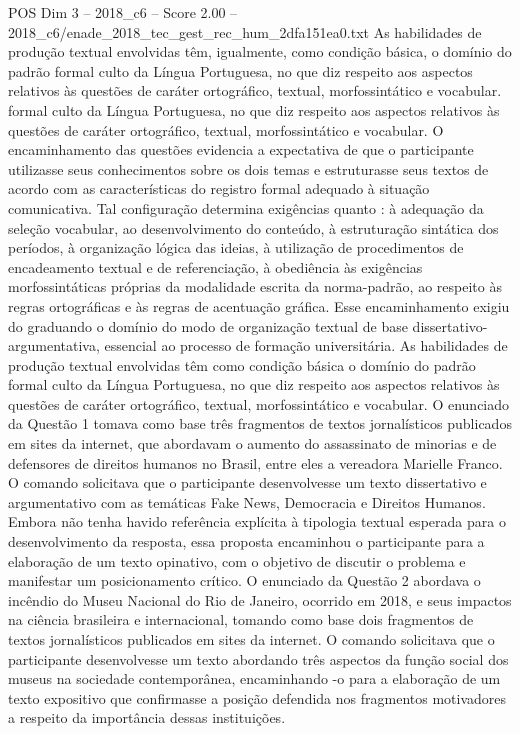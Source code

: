 \begin{textsample}{POS Dim 3 – 2018\_c6 – Score 2.00 – 2018\_c6/enade\_2018\_tec\_gest\_rec\_hum\_2dfa151ea0.txt}
As habilidades de produção textual envolvidas têm, igualmente, como condição básica, o domínio do padrão formal culto da Língua Portuguesa, no que diz respeito aos aspectos relativos às questões de caráter ortográfico, textual, morfossintático e vocabular. formal culto da Língua Portuguesa, no que diz respeito aos aspectos relativos às questões de caráter ortográfico, textual, morfossintático e vocabular.
O encaminhamento das questões evidencia a expectativa de que o participante utilizasse seus conhecimentos sobre os dois temas e estruturasse seus textos de acordo com as características do registro formal adequado à situação comunicativa.
Tal configuração determina exigências quanto : à adequação da seleção vocabular, ao desenvolvimento do conteúdo, à estruturação sintática dos períodos, à organização lógica das ideias, à utilização de procedimentos de encadeamento textual e de referenciação, à obediência às exigências morfossintáticas próprias da modalidade escrita da norma-padrão, ao respeito às regras ortográficas e às regras de acentuação gráfica.
Esse encaminhamento exigiu do graduando o domínio do modo de organização textual de base dissertativo-argumentativa, essencial ao processo de formação universitária.
As habilidades de produção textual envolvidas têm como condição básica o domínio do padrão formal culto da Língua Portuguesa, no que diz respeito aos aspectos relativos às questões de caráter ortográfico, textual, morfossintático e vocabular.
O enunciado da Questão 1 tomava como base três fragmentos de textos jornalísticos publicados em sites da internet, que abordavam o aumento do assassinato de minorias e de defensores de direitos humanos no Brasil, entre eles a vereadora Marielle Franco.
O comando solicitava que o participante desenvolvesse um texto dissertativo e argumentativo com as temáticas Fake News, Democracia e Direitos Humanos.
Embora não tenha havido referência explícita à tipologia textual esperada para o desenvolvimento da resposta, essa proposta encaminhou o participante para a elaboração de um texto opinativo, com o objetivo de discutir o problema e manifestar um posicionamento crítico.
O enunciado da Questão 2 abordava o incêndio do Museu Nacional do Rio de Janeiro, ocorrido em 2018, e seus impactos na ciência brasileira e internacional, tomando como base dois fragmentos de textos jornalísticos publicados em sites da internet.
O comando solicitava que o participante desenvolvesse um texto abordando três aspectos da função social dos museus na sociedade contemporânea, encaminhando -o para a elaboração de um texto expositivo que confirmasse a posição defendida nos fragmentos motivadores a respeito da importância dessas instituições.

\end{textsample}
